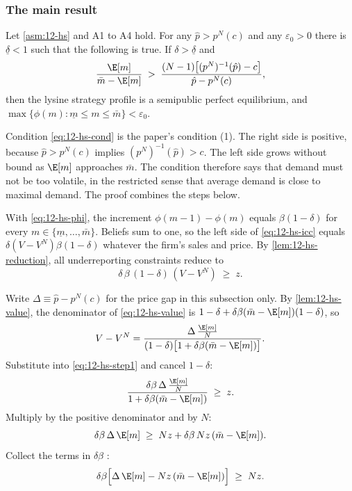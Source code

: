 \subsubsection{The main result}

\begin{theorem}\label{thm:12-hs}
Let \cref{asm:12-hs} and A1 to A4 hold. For any $\hat p > p^N(c)$ and any $\varepsilon_0 > 0$ there is
$\underline\delta < 1$ such that the following is true. If $\delta > \underline\delta$ and
\begin{equation}\label{eq:12-hs-cond}
  \frac{\E[m]}{\bar m - \E[m]} \;>\; \frac{(N-1)\bigl[(p^N)^{-1}(\hat p) - c\bigr]}{\hat p - p^N(c)},
\end{equation}
then the lysine strategy profile is a semipublic perfect equilibrium, and
$\max\{\phi(m) : \underline m \le m \le \bar m\} < \varepsilon_0$.
\end{theorem}

Condition \eqref{eq:12-hs-cond} is the paper's condition (1). The right side is positive, because
$\hat p > p^N(c)$ implies $(p^N)^{-1}(\hat p) > c$. The left side grows without bound as $\E[m]$ approaches
$\bar m$. The condition therefore says that demand must not be too volatile, in the restricted sense that average
demand is close to maximal demand. The proof combines the steps below.

With \eqref{eq:12-hs-phi}, the increment $\phi(m-1) - \phi(m)$ equals $\beta(1-\delta)$ for every
$m \in \{\underline m, \dots, \bar m\}$. Beliefs sum to one, so the left side of \eqref{eq:12-hs-icc} equals
$\delta(V - V^N)\beta(1-\delta)$ whatever the firm's sales and price. By \cref{lem:12-hs-reduction}, all
underreporting constraints reduce to
\begin{equation}\label{eq:12-hs-step1}
  \delta\,\beta\,(1-\delta)\,(V - V^N) \;\ge\; z .
\end{equation}

Write $\Delta \equiv \hat p - p^N(c)$ for the price gap in this subsection only. By \cref{lem:12-hs-value}, the
denominator of \eqref{eq:12-hs-value} is $1 - \delta + \delta\beta(\bar m - \E[m])(1 - \delta)$, so
\begin{equation*}
  V - V^N = \frac{\Delta\,\frac{\E[m]}{N}}{(1-\delta)\bigl[1 + \delta\beta(\bar m - \E[m])\bigr]} .
\end{equation*}
Substitute into \eqref{eq:12-hs-step1} and cancel $1 - \delta$:
\begin{equation*}
  \frac{\delta\beta\,\Delta\,\frac{\E[m]}{N}}{1 + \delta\beta(\bar m - \E[m])} \;\ge\; z .
\end{equation*}
Multiply by the positive denominator and by $N$:
\begin{equation*}
  \delta\beta\,\Delta\,\E[m] \;\ge\; Nz + \delta\beta\,Nz\,(\bar m - \E[m]) .
\end{equation*}
Collect the terms in $\delta\beta$ \citep[equation (26)]{HarringtonSkrzypacz2011}:
\begin{equation}\label{eq:12-hs-step2}
  \delta\beta\Bigl[\Delta\,\E[m] - Nz\,(\bar m - \E[m])\Bigr] \;\ge\; Nz .
\end{equation}

